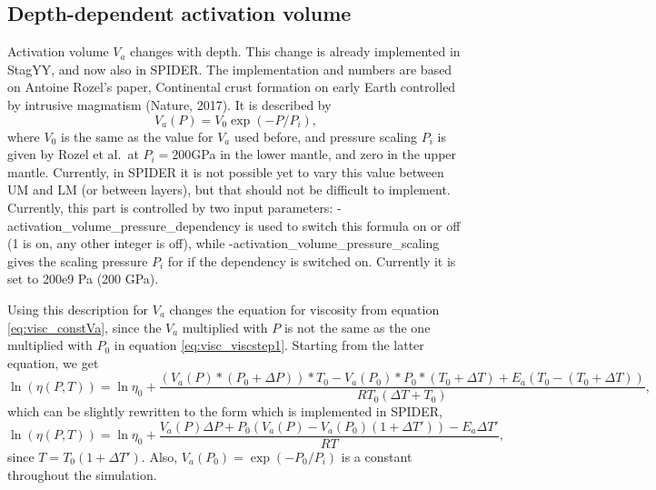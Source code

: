 \documentclass[12pt,notitlepage]{article}
\begin{document}
\subsection{Depth-dependent activation volume}
Activation volume $V_a$ changes with depth. This change is already implemented in StagYY, and now also in SPIDER. The implementation and numbers are based on Antoine Rozel's paper, Continental crust formation on early Earth controlled by intrusive magmatism (Nature, 2017). It is described by
\begin{equation}
V_a(P) = V_0 \exp(- P/P_i),
\end{equation}
where $V_0$ is the same as the value for $V_a$ used before, and pressure scaling $P_i$ is given by Rozel et al.\ at $P_i=200$GPa in the lower mantle, and zero in the upper mantle. Currently, in SPIDER it is not possible yet to vary this value between UM and LM (or between layers), but that should not be difficult to implement. Currently, this part is controlled by two input parameters: -activation\_volume\_pressure\_dependency is used to switch this formula on or off (1 is on, any other integer is off), while -activation\_volume\_pressure\_scaling gives the scaling pressure $P_i$ for if the dependency is switched on. Currently it is set to 200e9 Pa (200 GPa).


Using this description for $V_a$ changes the equation for viscosity from equation \ref{eq:visc_constVa}, since the $V_a$ multiplied with $P$ is not the same as the one multiplied with $P_0$ in equation \ref{eq:visc_viscstep1}. Starting from the latter equation, we get
\begin{equation*}
\ln ( \eta (P,T)) = \ln \eta_0 + \frac{( V_a(P)*(P_0 + \Delta P))*T_0 -  V_a(P_0)*P_0*(T_0 + \Delta T) + E_a (T_0 - (T_0 + \Delta T))}{R T_0 (\Delta T + T_0)},
\end{equation*}
which can be slightly rewritten to the form which is implemented in SPIDER,
\begin{equation}
\ln ( \eta (P,T)) = \ln \eta_0 + \frac{V_a(P) \Delta P + P_0 \left( V_a(P) - V_a(P_0) (1 + \Delta T' ) \right) - E_a \Delta T' }{R T},
\label{eq:visc_varVa}
\end{equation}
since $T = T_0(1 + \Delta T' )$. Also, $V_a(P_0) =\exp(-P_0/P_i)$ is a constant throughout the simulation.
\end{document}
